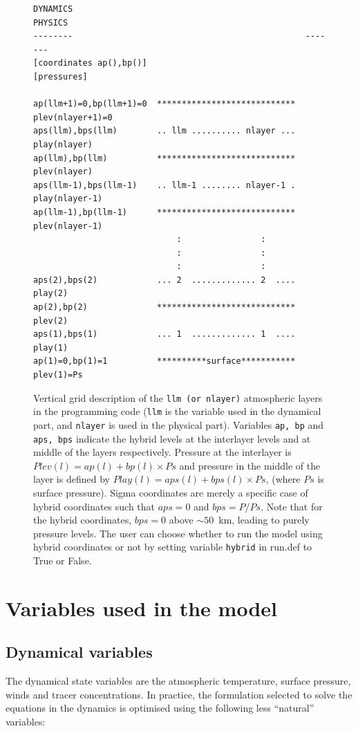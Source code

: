 \begin{figure}
\begin{verbatim}
DYNAMICS                                               PHYSICS
--------                                               -------
[coordinates ap(),bp()]                                [pressures]

ap(llm+1)=0,bp(llm+1)=0  ****************************  plev(nlayer+1)=0
aps(llm),bps(llm)        .. llm .......... nlayer ...  play(nlayer)
ap(llm),bp(llm)          ****************************  plev(nlayer)
aps(llm-1),bps(llm-1)    .. llm-1 ........ nlayer-1 .  play(nlayer-1)
ap(llm-1),bp(llm-1)      ****************************  plev(nlayer-1)
                             :                :
                             :                :
                             :                :
aps(2),bps(2)            ... 2  ............. 2  ....  play(2)
ap(2),bp(2)              ****************************  plev(2)
aps(1),bps(1)            ... 1  ............. 1  ....  play(1)
ap(1)=0,bp(1)=1          **********surface***********  plev(1)=Ps
\end{verbatim}
\caption{Vertical grid description of the {\tt llm (or nlayer)}
atmospheric layers
in the programming code ({\tt llm} is the variable used in the dynamical part,
and {\tt nlayer} is used in the physical part).
Variables {\tt ap, bp} and {\tt aps, bps} indicate the hybrid levels at
the interlayer levels and at middle of the layers respectively.
Pressure at the interlayer is  $Plev(l)=ap(l)+bp(l) \times Ps$ and pressure
in the middle of the layer is defined by $Play(l)=aps(l)+bps(l) \times Ps$,
(where $Ps$ is surface pressure).
Sigma coordinates are merely a specific case of hybrid
coordinates such that $aps=0$ and $bps=P/Ps$.
Note that for the hybrid coordinates, $bps=0$ above $\sim50$~km, leading to
purely pressure levels.
The user can choose whether to run the model using hybrid coordinates or not
by setting variable {\tt hybrid} in run.def to True or False.}
\label{fg:sigma}
\end{figure}

\section{Variables used in the model}

\subsection{Dynamical variables}
The dynamical state variables are the atmospheric temperature,
surface pressure, winds and tracer concentrations.
In practice, the formulation selected to solve the equations in
the dynamics %
is optimised using the following less ``natural'' variables:

